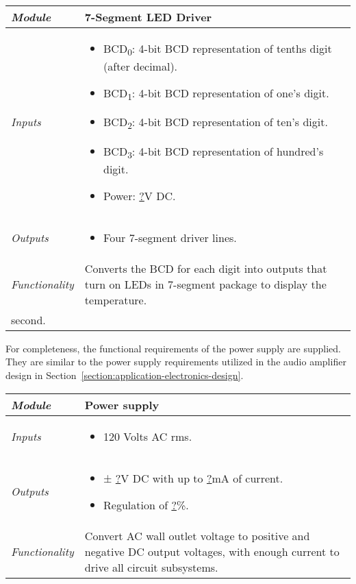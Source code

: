 \begin{table}
\begin{tabular}{|l|m{10cm}|}
\hline
\emph{Module} & 7-Segment LED Driver\\ \hline
\emph{Inputs} & 
\begin{itemize}
\item
  BCD\textsubscript{0}: 4-bit BCD representation of tenths digit (after
  decimal).
\item
  BCD\textsubscript{1}: 4-bit BCD representation of one's digit.
\item
  BCD\textsubscript{2}: 4-bit BCD representation of ten's digit.
\item
  BCD\textsubscript{3}: 4-bit BCD representation of hundred's digit.
\item
  Power: \ul{?}V DC.
\end{itemize}  \\ \hline
\emph{Outputs} & 
\begin{itemize}
\item
  Four 7-segment driver lines.
\end{itemize}\\ \hline
\emph{Functionality} & Converts the BCD for each digit into outputs that
turn on LEDs in 7-segment package to display the temperature. \\
second. \\ \hline
\end{tabular}
\end{table}



For completeness, the functional requirements of the power supply are
supplied. They are similar to the power supply requirements utilized in
the audio amplifier design in Section~\ref{section:application-electronics-design}.

\begin{table}
\begin{tabular}{|l|m{10cm}|}
\hline
\emph{Module} & Power supply\\ \hline

\emph{Inputs} & 
\begin{itemize}
\item  120 Volts AC rms.
\end{itemize} \\ \hline

\emph{Outputs} & 
\begin{itemize}
\item  ± \ul{?}V DC with up to \ul{?}mA of current.
\item  Regulation of \ul{?}\%.
\end{itemize}\\ \hline

\emph{Functionality} & Convert AC wall outlet voltage to positive and
negative DC output voltages, with enough current to drive all circuit
subsystems. \\ \hline

\end{tabular}
\end{table}



